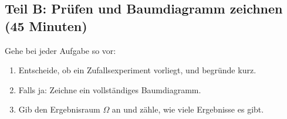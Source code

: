 \subsection*{Teil B: Prüfen und Baumdiagramm zeichnen (45 Minuten)}

Gehe bei jeder Aufgabe so vor:
\begin{enumerate}[label=\arabic*.]
    \item Entscheide, ob ein Zufallsexperiment vorliegt, und begründe kurz.
    \item Falls ja: Zeichne ein vollständiges Baumdiagramm.
    \item Gib den Ergebnisraum $\Omega$ an und zähle, wie viele Ergebnisse es gibt.
\end{enumerate}

\newcommand{\baumaufgabe}[2]{%
    \item \begin{minipage}[t]{\linewidth}
    #1

    \vspace{0.2cm}
    Zufallsexperiment? \; $\square$ ja \; $\square$ nein \qquad Begründung: \antwortlinie{5.5cm}

    \vspace{0.2cm}
    Baumdiagramm:
    \vspace{#2}

    $\Omega = $ \antwortlinie{10cm} \qquad Anzahl: \antwortlinie{1.5cm}
    \end{minipage}
    \vspace{0.6cm}
}

